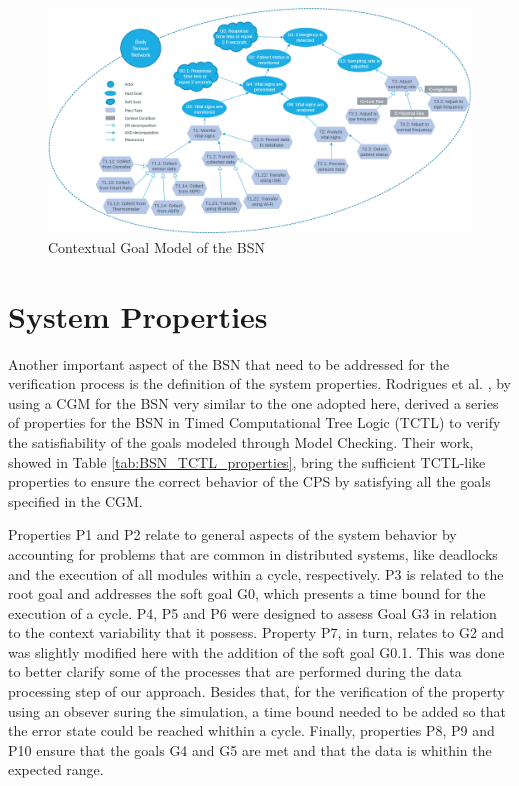 \begin{figure}[!h]
	\centering
	\includegraphics[width=1\textwidth, keepaspectratio]{img/cgm_bsn.png}
	\caption{Contextual Goal Model of the BSN}
	\label{fig:BSN-CGM}
\end{figure}

\section{System Properties}

Another important aspect of the BSN that need to be addressed for the verification process is the definition of the system properties. Rodrigues et al. \cite{seams2018}, by using a CGM for the BSN very similar to the one adopted here, derived a series of properties for the BSN in Timed Computational Tree Logic (TCTL) \cite{henzinger1994symbolic} to verify the satisfiability of the goals modeled through Model Checking. Their work, showed in Table \ref{tab:BSN_TCTL_properties}, bring the sufficient TCTL-like properties to ensure the correct behavior of the CPS by satisfying all the goals specified in the CGM. 

Properties P1 and P2 relate to general aspects of the system behavior by accounting for problems that are common in distributed systems, like deadlocks and the execution of all modules within a cycle, respectively. P3 is related to the root goal and addresses the soft goal G0, which presents a time bound for the execution of a cycle.  P4, P5 and P6 were designed to assess Goal G3 in relation to the context variability that it possess. Property P7, in turn, relates to G2 and was slightly modified here with the addition of the soft goal G0.1. This was done to better clarify some of the processes that are performed during the data processing step of our approach. Besides that, for the verification of the property using an obsever suring the simulation, a time bound needed to be added so that the error state could be reached whithin a cycle. Finally, properties P8, P9 and P10 ensure that the goals G4 and G5 are met and that the data is whithin the expected range.

